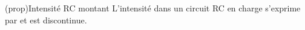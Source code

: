 \documentclass[../../main/main.tex]{subfiles}
\begin{document}
\begin{tcb*}[label=prop:irc-charge, sidebyside, righthand ratio=.3]
	(prop){Intensité RC montant}
	L'intensité dans un circuit RC en charge s'exprime par
	\psw{%
		\[
			\boxed{i(t) = \frac{E}{R}\exp \left(-\frac{t}{\tau} \right)}
		\]
	}%
	et est discontinue.
	\tcblower
	\begin{center}
	\end{center}
\end{tcb*}
\end{document}
